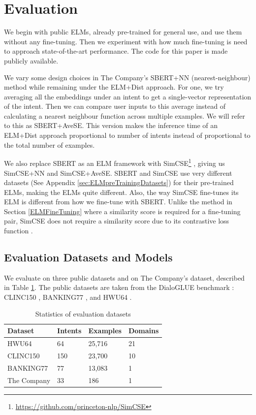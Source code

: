 \documentclass[sigconf, anonymous=true]{acmart}
\begin{document}
\section{Evaluation}
We begin with public ELMs, already pre-trained for general use, and use them without any fine-tuning. Then we experiment with how much fine-tuning is need to approach state-of-the-art performance. The code for this paper is made publicly available. 

We vary some design choices in The Company's SBERT+NN (nearest-neighbour) method while remaining under the ELM+Dist approach. For one, we try averaging all the embeddings under an intent to get a single-vector representation of the intent. Then we can compare user inputs to this average instead of calculating a nearest neighbour function across multiple examples. We will refer to this as SBERT+AveSE. This version makes the inference time of an ELM+Dist approach proportional to number of intents instead of proportional to the total number of examples.  

We also replace SBERT as an ELM framework with SimCSE\footnote{\url{https://github.com/princeton-nlp/SimCSE}} \citep{gao2021simcse}, giving us SimCSE+NN and SimCSE+AveSE. SBERT and SimCSE use very different datasets (See Appendix \ref{sec:ELMpreTrainingDatasets}) for their pre-trained ELMs, making the ELMs quite different. Also, the way SimCSE fine-tunes its ELM is different from how we fine-tune with SBERT. Unlike %
the method in Section \ref{ELMFineTuning} where a similarity score is required for a fine-tuning pair, SimCSE does not require a similarity score due to its contrastive loss function \citep{gao2021simcse}. 

\subsection{\textbf{Evaluation Datasets and Models}} 
We evaluate on three public datasets and on The Company's dataset, described in Table \ref{tab:freq}. The public datasets are taken from the DialoGLUE benchmark \cite{MehriDialoGLUE2020}: CLINC150 \citep{larson-etal-2019-evaluation}, BANKING77 \citep{casanueva-etal-2020-efficient}, and HWU64 \citep{liu2019benchmarking}.  

\begin{table}[h]
\setlength{} %
\footnotesize\centering
\begin{tabular}{llll}
\hline \textbf{Dataset} & \textbf{Intents} & \textbf{Examples} & \textbf{Domains} \\
\hline HWU64 & 64 & 25,716 & 21 \\
CLINC150 & 150 & 23,700& 10 \\
BANKING77 & 77 & 13,083 & 1 \\
The Company & 33 & 186 & 1 \\
\hline
\end{tabular}
\caption{Statistics of evaluation datasets}
\label{tab:freq}
\end{table}
 
\end{document}
